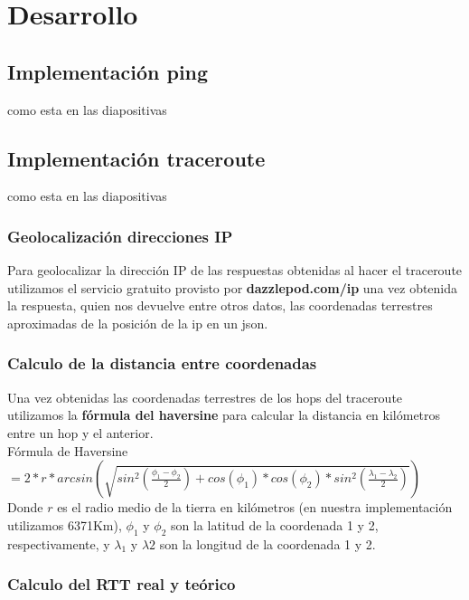 \section{Desarrollo}

\subsection{Implementación ping}

como esta en las diapositivas

\subsection{Implementación traceroute}

como esta en las diapositivas

\subsubsection{Geolocalización direcciones IP}

Para geolocalizar la dirección IP de las respuestas obtenidas al hacer el traceroute utilizamos el servicio gratuito provisto por \textbf{dazzlepod.com/ip} una vez obtenida la respuesta, quien nos devuelve entre otros datos, las coordenadas terrestres aproximadas de la posición de la ip en un json.

\subsubsection{Calculo de la distancia entre coordenadas}

Una vez obtenidas las coordenadas terrestres de los hops del traceroute utilizamos la \textbf{fórmula del haversine} para calcular la distancia en kilómetros entre un hop y el anterior.	\\
Fórmula de Haversine $ = 2 * r * arcsin \left (\sqrt{sin^{2} \left (\frac{\phi_{1}-\phi_{2}}{2}\right ) + cos(\phi_{1}) * cos(\phi_{2}) * sin^{2} \left (\frac{\lambda_{1}-\lambda_{2}}{2}\right )}\right )$	\\
Donde $r$ es el radio medio de la tierra en kilómetros (en nuestra implementación utilizamos 6371Km), $\phi_{1}$ y $\phi_{2}$ son la latitud de la coordenada 1 y 2, respectivamente, y $\lambda_{1}$ y $\lambda{2}$ son la longitud de la coordenada 1 y 2.

\subsubsection{Calculo del RTT real y teórico}

